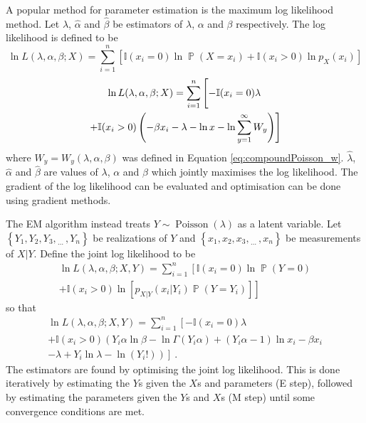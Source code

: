 \documentclass[12pt, a4paper]{memoir}
\DeclareMathOperator{\prob}{\mathbb{P}}
\DeclareMathOperator{\poisson}{Poisson}
\newcommand{\dotdotdot}{_{\phantom{.}\cdots}}
\begin{document}
A popular method for parameter estimation is the maximum log likelihood method. Let $\widehat{\lambda}$, $\widehat{\alpha}$ and $\widehat{\beta}$ be estimators of $\lambda$, $\alpha$ and $\beta$ respectively. The log likelihood is defined to be
\begin{equation*}
\ln L(\lambda,\alpha,\beta;X) = \sum_{i=1}^n\left[
\mathbb{I}(x_i=0)\ln \prob(X=x_i)
+\mathbb{I}(x_i>0)\ln p_X(x_i)
\right]
\end{equation*}
\begin{multline}
\ln L(\lambda,\alpha,\beta;X) = \sum_{i=1}^n\left[
-\mathbb{I}(x_i=0)\lambda
\vphantom{\sum_i^i}\right.\\\left.
+\mathbb{I}(x_i>0)\left(
	-\beta x_i-\lambda-\ln x -\ln\sum_{y=1}^\infty W_y
\right)
\right]
\end{multline}
where $W_y=W_y(\lambda,\alpha,\beta)$ was defined in Equation \eqref{eq:compoundPoisson_w}. $\widehat{\lambda}$, $\widehat{\alpha}$ and $\widehat{\beta}$ are values of $\lambda$, $\alpha$ and $\beta$ which jointly maximises the log likelihood. The gradient of the log likelihood can be evaluated \citep{dunn2005series} and optimisation can be done using gradient methods.

The EM algorithm \citep{dempster1977maximum} instead treats $Y\sim\poisson(\lambda)$ as a latent variable. Let $\left\{Y_1,Y_2,Y_3,\dotdotdot, Y_n\right\}$ be realizations of $Y$ and $\left\{x_1,x_2,x_3,\dotdotdot, x_n\right\}$ be measurements of $X|Y$. Define the joint log likelihood to be
\begin{multline*}
\ln L(\lambda,\alpha,\beta;X,Y)
=
\sum_{i=1}^n
\left[
	\mathbb{I}(x_i=0)
	\ln
	\prob(Y=0)
	\right.\\\left.
	+
	\mathbb{I}(x_i>0)
	\ln
	\left[
	p_{X|Y}(x_i|Y_i)\prob(Y=Y_i)
	\right]
\right]
\end{multline*}
so that
\begin{multline}
\ln L(\lambda,\alpha,\beta;X,Y)
=
\sum_{i=1}^n
\left[
	-\mathbb{I}(x_i=0)
	\lambda
	\right.\\\left.+
	\mathbb{I}(x_i>0)
	\left(
	Y_i\alpha\ln\beta-\ln\Gamma(Y_i\alpha)+(Y_i\alpha-1)\ln x_i - \beta x_i
	\right.\right.\\\left.\left.	
	- \lambda + Y_i \ln \lambda - \ln(Y_i!)
	\right)
\right] \ .
\end{multline}
The estimators are found by optimising the joint log likelihood. This is done iteratively by estimating the $Y$s given the $X$s and parameters (E step), followed by estimating the parameters given the $Y$s and $X$s (M step) until some convergence conditions are met.
\end{document}
